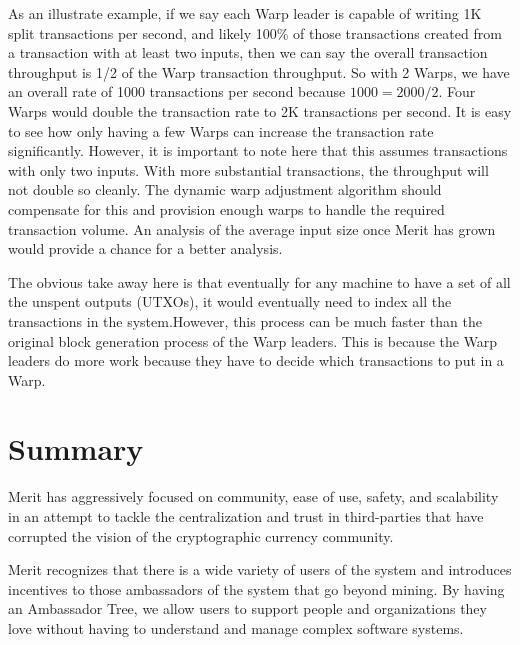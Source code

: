 \documentclass{article}
\begin{document}
As an illustrate example, if we say each Warp leader is capable of writing 1K split
transactions per second, and likely 100\% of those transactions created from a
transaction with at least two inputs, then we can say the overall transaction
throughput is 1/2 of the Warp transaction throughput. So with 2 Warps, we have
an overall rate of 1000 transactions per second because $1000 = 2000/2$. Four
Warps would double the transaction rate to 2K transactions per second. It is 
easy to see how only having a few Warps can increase the transaction rate
significantly. However, it is important to note here that this assumes transactions
with only two inputs. With more substantial transactions, the throughput will not
double so cleanly. The dynamic warp adjustment algorithm should compensate for
this and provision enough warps to handle the required transaction volume. An
analysis of the average input size once Merit has grown would provide a chance
for a better analysis.

The obvious take away here is that eventually for any machine to have a set of
all the unspent outputs (UTXOs), it would eventually need to index all the
transactions in the system.However, this process can be much faster than the
original block generation process of the Warp leaders. This is because the Warp
leaders do more work because they have to decide which transactions to put in a Warp.

\section{Summary}

Merit has aggressively focused on community, ease of use, safety, and scalability in an
attempt to tackle the centralization and trust in third-parties that have corrupted
the vision of the cryptographic currency community.

Merit recognizes that there is a wide variety of users of the system and introduces
incentives to those ambassadors of the system that go beyond mining. By having
an Ambassador Tree, we allow users to support people and organizations they love
without having to understand and manage complex software systems.

\clearpage
\printglossaries
\end{document}
